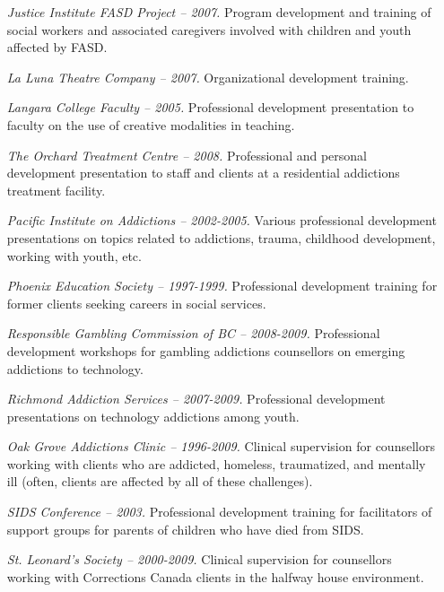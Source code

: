 \documentclass[10pt,DIV09,letterpaper,oneside,headsepline]{scrreprt}
\begin{document}
\begin{itemize}
\item [\textit{Justice Institute FASD Project -- 2007.}]
Program development and training of social workers and associated caregivers involved with children and youth affected by FASD.

\item [\textit{La Luna Theatre Company -- 2007.}]
Organizational development training.

\item [\textit{Langara College Faculty -- 2005.}]
Professional development presentation to faculty on the use of creative modalities in teaching.

\item [\textit{The Orchard Treatment Centre -- 2008.}]
Professional and personal development presentation to staff and clients at a residential addictions treatment facility.

\item [\textit{Pacific Institute on Addictions -- 2002-2005.}]
Various professional development presentations on topics related to addictions, trauma, childhood development, working with youth, etc.

\item [\textit{Phoenix Education Society -- 1997-1999.}]
Professional development training for former clients seeking careers in social services.

\item [\textit{Responsible Gambling Commission of BC -- 2008-2009.}]
Professional development workshops for gambling addictions counsellors on emerging addictions to technology.

\item [\textit{Richmond Addiction Services -- 2007-2009.}]
Professional development presentations on technology addictions among youth.

\item [\textit{Oak Grove Addictions Clinic -- 1996-2009.}]
Clinical supervision for counsellors working with clients who are addicted, homeless, traumatized, and mentally ill (often, clients are affected by all of these challenges).

\item [\textit{SIDS Conference -- 2003.}]
Professional development training for facilitators of support groups for parents of children who have died from SIDS.

\item [\textit{St. Leonard's Society -- 2000-2009.}]
Clinical supervision for counsellors working with Corrections Canada clients in the halfway house environment.


\end{itemize}
\end{document}
